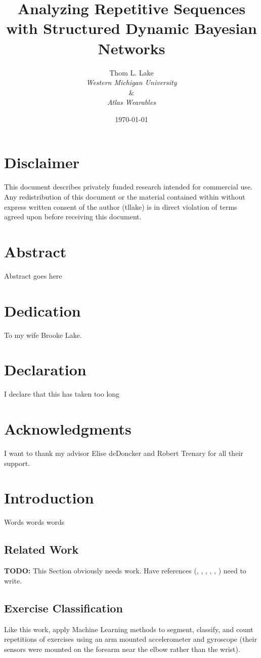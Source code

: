 \documentclass[12pt]{report}
\author{Thom L. Lake\\\normalsize{\emph{Western Michigan University}}\\\&\\\normalsize{\emph{Atlas Wearables}}}
\title{Analyzing Repetitive Sequences with Structured Dynamic Bayesian Networks}
\date{\yyyymmdddate\today}
\newcommand{\1}[0]{\mathbbm{1}}
\begin{document}
\maketitle

\chapter*{Disclaimer}
This document describes privately funded research intended
for commercial use. Any redistribution of this document or the material 
contained within without express written consent of the author (tllake) 
is in direct violation of terms agreed upon before receiving this document.

\chapter*{Abstract}
Abstract goes here

\chapter*{Dedication}
To my wife Brooke Lake.

\chapter*{Declaration}
I declare that this has taken too long

\chapter*{Acknowledgments}
I want to thank my advisor Elise deDoncker and Robert Trenary for all their support.

\tableofcontents

\chapter{Introduction}
Words words words

\section{Related Work}
\textbf{TODO:} This Section obviously needs work. Have references 
(\cite{ms-overview}, 
\cite{arm-worn-muehlbauer},
\cite{phone-kwapisz},
\cite{weka-aaai-ravi},
\cite{multiple-sensor-bao},
\cite{taylor-crbm-2006}) need to write.

\section{Exercise Classification}
Like this work, \cite{ms-activity} apply Machine Learning methods to segment, classify, and count repetitions
of exercises using an arm mounted accelerometer and gyroscope (their sensors were mounted on the forearm 
near the elbow rather than the wrist).
\end{document}
